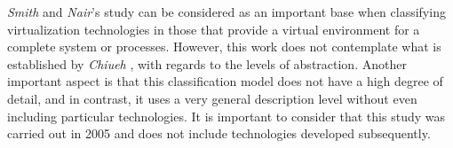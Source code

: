 	
	\textit{Smith} and \textit{Nair}'s study \cite{Smith2005} can be considered as an important base when classifying virtualization technologies in those that provide a virtual environment for a complete system or processes. However, this work does not contemplate what is established by \textit{Chiueh} \cite{Chiueh2005}, with regards to the levels of abstraction. Another important aspect is that this classification model does not have a high degree of detail, and in contrast, it uses a very general description level without even including particular technologies. It is important to consider that this study was carried out in 2005 and does not include technologies developed  subsequently.
	
